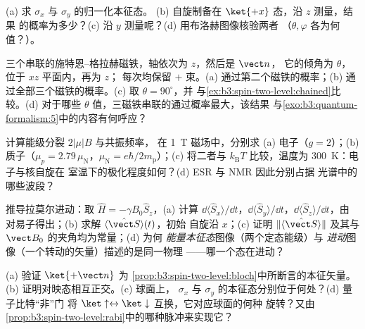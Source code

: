 \begin{exercise}[$\star$]\label{exo:b3:spin-two-level:2}
(a) 求 $\sigma_x$ 与 $\sigma_y$ 的归一化本征态。
(b) 自旋制备在 $\ket{+x}$ 态，沿 $z$ 测量，结果
的概率为多少？(c) 沿 $y$ 测量呢？(d) 用布洛赫图像核验两者
（$\theta, \varphi$ 各为何值？）。
\end{exercise}

\begin{exercise}[$\star$]\label{exo:b3:spin-two-level:3}
三个串联的施特恩–格拉赫磁铁，轴依次为 $z$，然后是 $\vect n$，
它的倾角为 $\theta$，位于 $xz$ 平面内，再为 $z$；
每次均保留 $+$ 束。(a) 通过第二个磁铁的概率；(b)
通过全部三个磁铁的概率。(c) 取 $\theta = 90^\circ$，并
与\cref{ex:b3:spin-two-level:chained}比较。(d) 对于哪些
$\theta$ 值，三磁铁串联的通过概率最大，该结果
与\cref{exo:b3:quantum-formalism:5}中的内容有何呼应？
\end{exercise}

\begin{exercise}[$\star$]\label{exo:b3:spin-two-level:4}
计算能级分裂 $2|\mu|B$ 与共振频率，
在 \qty{1}{T} 磁场中，分别求 (a) 电子（$g = 2$）；(b)
质子（$\mu_p = 2.79\,\mu_{\text{N}}$，$\mu_{\text{N}} =
e\hbar/2m_{\text{p}}$）；(c) 将二者与 $k_{\text{B}}T$ 比较，温度为
\qty{300}{K}：电子与核自旋在
室温下的极化程度如何？(d) ESR 与 NMR 因此分别占据
光谱中的哪些波段？
\end{exercise}

\begin{exercise}[$\star\star$]\label{exo:b3:spin-two-level:5}
推导拉莫尔进动：取 $\hat H = -\gamma B_0\hat S_z$，(a)
计算 $\dd\langle\hat S_x\rangle/\dd t$，$\dd\langle\hat
S_y\rangle/\dd t$，$\dd\langle\hat S_z\rangle/\dd t$，由
对易子得出；(b) 求解 $\langle\hat{\vect S}\rangle(t)$，初始
自旋沿 $x$；(c) 证明 $\|\langle\hat{\vect S}\rangle\|$
及其与 $\vect B_0$ 的夹角均为常量；(d) 为何
\emph{能量本征态}图像（两个定态能级）与
\emph{进动}图像（一个转动的矢量）描述的是同一物理
——哪一个态在进动？
\end{exercise}

\begin{exercise}[$\star\star$]\label{exo:b3:spin-two-level:6}
(a) 验证 $\ket{+\vect n}$ 为
\cref{prop:b3:spin-two-level:bloch}中所断言的本征矢量。(b)
证明对映态相互正交。(c) 球面上，
$\sigma_x$ 与 $\sigma_y$ 的本征态分别位于何处？(d) 量子比特“非”门
将 $\ket\uparrow \leftrightarrow \ket\downarrow$ 互换，它对应球面的何种
旋转？又由
\cref{prop:b3:spin-two-level:rabi}中的哪种脉冲来实现它？
\end{exercise}

